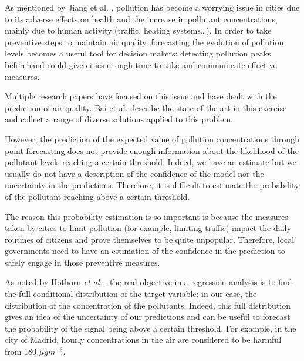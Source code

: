 \documentclass[a4paper,3p,sort&compress]{elsarticle}
\begin{document}
As mentioned by Jiang et al. \cite{jiang_spatio-temporal_2018}, 
pollution has become a worrying issue in cities due to its adverse
effects on health and the increase in pollutant concentrations, mainly
due to human activity (traffic, heating systems\ldots). In order to
take preventive steps to maintain air quality, forecasting the
evolution of pollution levels becomes a useful tool for decision
makers: detecting pollution peaks beforehand could give cities enough
time to take and communicate effective measures.

Multiple research papers have focused on this issue and have dealt
with the prediction of air quality. Bai et al. \cite{bai_air_2018}
describe the state of the art in this exercise and collect a range
of diverse solutions applied to this problem.

However, the prediction of the expected value of pollution
concentrations through point-forecasting does not provide enough
information about the likelihood of the pollutant levels reaching a
certain threshold. Indeed, we have an estimate but we usually do not
have a description of the confidence of the model nor the uncertainty
in the predictions. Therefore, it is difficult to estimate the
probability of the pollutant reaching above a certain threshold.

The reason this probability estimation is so important is because the
measures taken by cities to limit pollution (for example, limiting
traffic) impact the daily routines of citizens and prove themselves to
be quite unpopular. Therefore, local governments need to have an
estimation of the confidence in the prediction to safely engage in
those preventive measures.


As noted by Hothorn \emph{et al.} \cite{hothorn_conditional_2014}, the real
objective in a regression analysis is to find the full conditional distribution
of the target variable: in our case, the distribution of the concentration of
the pollutants. Indeed, this full distribution gives an idea of the uncertainty
of our predictions and can be useful to forecast the probability of the signal
being above a certain threshold. For example, in the city of Madrid, hourly \no
concentrations in the air are considered to be harmful from 180 $\mu g m^{-3}$.
\end{document}
